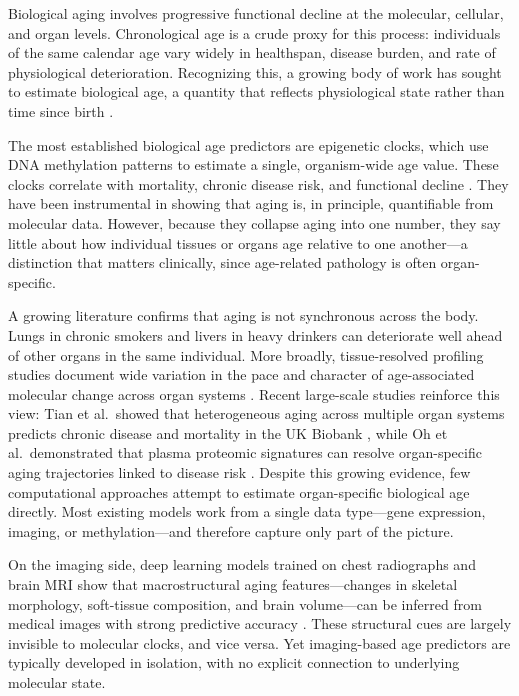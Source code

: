 \documentclass[10pt,twocolumn]{article}
\begin{document}
Biological aging involves progressive functional decline at the molecular, cellular, and organ
levels. Chronological age is a crude proxy for this process: individuals of the same calendar
age vary widely in healthspan, disease burden, and rate of physiological deterioration.
Recognizing this, a growing body of work has sought to estimate biological age, a quantity
that reflects physiological state rather than time since birth \cite{horvath2013,hannum2013}.

The most established biological age predictors are epigenetic clocks, which use DNA methylation
patterns to estimate a single, organism-wide age value. These clocks correlate with mortality,
chronic disease risk, and functional decline \cite{levine2018}. They have been instrumental in
showing that aging is, in principle, quantifiable from molecular data. However, because they
collapse aging into one number, they say little about how individual tissues or organs age
relative to one another---a distinction that matters clinically, since age-related pathology
is often organ-specific.

A growing literature confirms that aging is not synchronous across the body. Lungs in chronic
smokers and livers in heavy drinkers can deteriorate well ahead of other organs in the same
individual. More broadly, tissue-resolved profiling studies document wide variation in the pace
and character of age-associated molecular change across organ systems \cite{zakarpolyak2023}.
Recent large-scale studies reinforce this view: Tian et al.\ showed that heterogeneous aging
across multiple organ systems predicts chronic disease and mortality in the UK Biobank
\cite{tian2023heterogeneous}, while Oh et al.\ demonstrated that plasma proteomic signatures
can resolve organ-specific aging trajectories linked to disease risk \cite{oh2023organ}.
Despite this growing evidence, few computational approaches attempt to estimate organ-specific
biological age directly. Most existing models work from a single data type---gene expression,
imaging, or methylation---and therefore capture only part of the picture.

On the imaging side, deep learning models trained on chest radiographs and brain MRI show that
macrostructural aging features---changes in skeletal morphology, soft-tissue composition, and
brain volume---can be inferred from medical images with strong predictive accuracy
\cite{cole2017,rajpurkar2018chexnet}. These structural cues are largely invisible to molecular
clocks, and vice versa. Yet imaging-based age predictors are typically developed in isolation,
with no explicit connection to underlying molecular state.
\end{document}
